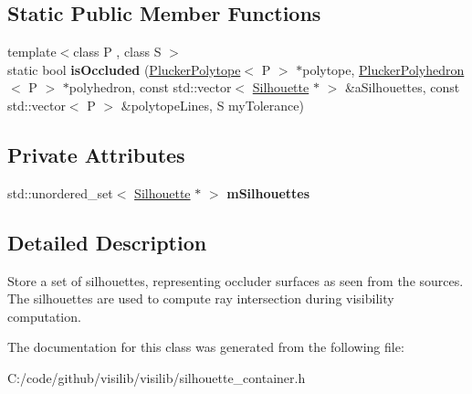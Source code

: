 \subsection*{Static Public Member Functions}
\begin{DoxyCompactItemize}
\item 
\mbox{\label{classvisilib_1_1_silhouette_container_a84194087a8fd4c5d1dfa04067efa3b72}} 
{\footnotesize template$<$class P , class S $>$ }\\static bool {\bfseries is\+Occluded} (\mbox{\hyperlink{classvisilib_1_1_plucker_polytope}{Plucker\+Polytope}}$<$ P $>$ $\ast$polytope, \mbox{\hyperlink{classvisilib_1_1_plucker_polyhedron}{Plucker\+Polyhedron}}$<$ P $>$ $\ast$polyhedron, const std\+::vector$<$ \mbox{\hyperlink{classvisilib_1_1_silhouette}{Silhouette}} $\ast$ $>$ \&a\+Silhouettes, const std\+::vector$<$ P $>$ \&polytope\+Lines, S my\+Tolerance)
\end{DoxyCompactItemize}
\subsection*{Private Attributes}
\begin{DoxyCompactItemize}
\item 
\mbox{\label{classvisilib_1_1_silhouette_container_a5a230bee3e0736d3c21080a632989d52}} 
std\+::unordered\+\_\+set$<$ \mbox{\hyperlink{classvisilib_1_1_silhouette}{Silhouette}} $\ast$ $>$ {\bfseries m\+Silhouettes}
\end{DoxyCompactItemize}


\subsection{Detailed Description}
Store a set of silhouettes, representing occluder surfaces as seen from the sources. The silhouettes are used to compute ray intersection during visibility computation. 

The documentation for this class was generated from the following file\+:\begin{DoxyCompactItemize}
\item 
C\+:/code/github/visilib/visilib/silhouette\+\_\+container.\+h\end{DoxyCompactItemize}

